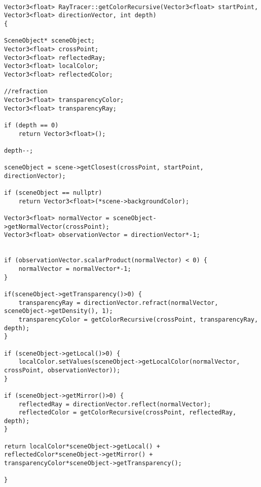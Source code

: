 \begin{lstlisting}[caption={Fragment klasy \emph{RayTracer}}]

Vector3<float> RayTracer::getColorRecursive(Vector3<float> startPoint, Vector3<float> directionVector, int depth)
{

SceneObject* sceneObject;
Vector3<float> crossPoint;
Vector3<float> reflectedRay;
Vector3<float> localColor;
Vector3<float> reflectedColor;

//refraction
Vector3<float> transparencyColor;
Vector3<float> transparencyRay;

if (depth == 0)
    return Vector3<float>();

depth--;

sceneObject = scene->getClosest(crossPoint, startPoint, directionVector);

if (sceneObject == nullptr)
    return Vector3<float>(*scene->backgroundColor);

Vector3<float> normalVector = sceneObject->getNormalVector(crossPoint);
Vector3<float> observationVector = directionVector*-1;


if (observationVector.scalarProduct(normalVector) < 0) {
    normalVector = normalVector*-1;
}

if(sceneObject->getTransparency()>0) {
    transparencyRay = directionVector.refract(normalVector, sceneObject->getDensity(), 1);
    transparencyColor = getColorRecursive(crossPoint, transparencyRay, depth);
}

if (sceneObject->getLocal()>0) {
    localColor.setValues(sceneObject->getLocalColor(normalVector, crossPoint, observationVector));
}

if (sceneObject->getMirror()>0) {
    reflectedRay = directionVector.reflect(normalVector);
    reflectedColor = getColorRecursive(crossPoint, reflectedRay, depth);
}

return localColor*sceneObject->getLocal() + reflectedColor*sceneObject->getMirror() + transparencyColor*sceneObject->getTransparency();

}

\end{lstlisting}
	
